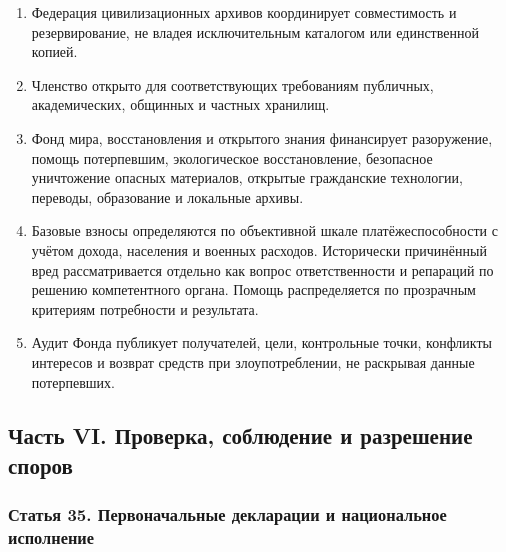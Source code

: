 \documentclass[
  russian,
  11pt,
  a4paper,
]{article}
\providecommand{\tightlist}{%
  \setlength{\itemsep}{0pt}\setlength{\parskip}{0pt}}
\begin{document}
\begin{enumerate}
\def\labelenumi{\arabic{enumi}.}
\tightlist
\item
  Федерация цивилизационных архивов координирует совместимость и
  резервирование, не владея исключительным каталогом или единственной
  копией.
\item
  Членство открыто для соответствующих требованиям публичных,
  академических, общинных и частных хранилищ.
\item
  Фонд мира, восстановления и открытого знания финансирует разоружение,
  помощь потерпевшим, экологическое восстановление, безопасное
  уничтожение опасных материалов, открытые гражданские технологии,
  переводы, образование и локальные архивы.
\item
  Базовые взносы определяются по объективной шкале платёжеспособности с
  учётом дохода, населения и военных расходов. Исторически причинённый
  вред рассматривается отдельно как вопрос ответственности и репараций
  по решению компетентного органа. Помощь распределяется по прозрачным
  критериям потребности и результата.
\item
  Аудит Фонда публикует получателей, цели, контрольные точки, конфликты
  интересов и возврат средств при злоупотреблении, не раскрывая данные
  потерпевших.
\end{enumerate}

\subsection{Часть VI. Проверка, соблюдение и разрешение
споров}\label{ux447ux430ux441ux442ux44c-vi-ux43fux440ux43eux432ux435ux440ux43aux430-ux441ux43eux431ux43bux44eux434ux435ux43dux438ux435-ux438-ux440ux430ux437ux440ux435ux448ux435ux43dux438ux435-ux441ux43fux43eux440ux43eux432}

\subsubsection{Статья 35. Первоначальные декларации и национальное
исполнение}\label{ux441ux442ux430ux442ux44cux44f-35-ux43fux435ux440ux432ux43eux43dux430ux447ux430ux43bux44cux43dux44bux435-ux434ux435ux43aux43bux430ux440ux430ux446ux438ux438-ux438-ux43dux430ux446ux438ux43eux43dux430ux43bux44cux43dux43eux435-ux438ux441ux43fux43eux43bux43dux435ux43dux438ux435}
\end{document}
